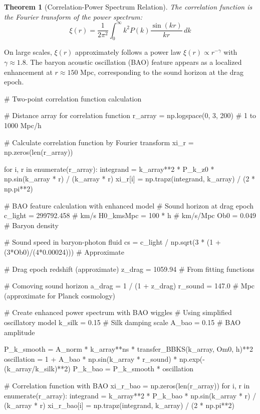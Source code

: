\documentclass[a4paper, 11pt]{article}
\newtheorem{theorem}{Theorem}[section]
\begin{document}
\begin{theorem}[Correlation-Power Spectrum Relation]
The correlation function is the Fourier transform of the power spectrum:
\begin{equation}
\xi(r) = \frac{1}{2\pi^2} \int_0^{\infty} k^2 P(k) \frac{\sin(kr)}{kr} \, dk
\end{equation}
\end{theorem}

On large scales, $\xi(r)$ approximately follows a power law $\xi(r) \propto r^{-\gamma}$ with
$\gamma \approx 1.8$. The baryon acoustic oscillation (BAO) feature appears as a localized
enhancement at $r \approx 150$ Mpc, corresponding to the sound horizon at the drag epoch.

\begin{pycode}
# Two-point correlation function calculation

# Distance array for correlation function
r_array = np.logspace(0, 3, 200)  # 1 to 1000 Mpc/h

# Calculate correlation function by Fourier transform
xi_r = np.zeros(len(r_array))

for i, r in enumerate(r_array):
    integrand = k_array**2 * P_k_z0 * np.sin(k_array * r) / (k_array * r)
    xi_r[i] = np.trapz(integrand, k_array) / (2 * np.pi**2)

# BAO feature calculation with enhanced model
# Sound horizon at drag epoch
c_light = 299792.458  # km/s
H0_kmsMpc = 100 * h   # km/s/Mpc
Ob0 = 0.049           # Baryon density

# Sound speed in baryon-photon fluid
cs = c_light / np.sqrt(3 * (1 + (3*Ob0)/(4*0.00024)))  # Approximate

# Drag epoch redshift (approximate)
z_drag = 1059.94  # From fitting functions

# Comoving sound horizon
a_drag = 1 / (1 + z_drag)
r_sound = 147.0  # Mpc (approximate for Planck cosmology)

# Create enhanced power spectrum with BAO wiggles
# Using simplified oscillatory model
k_silk = 0.15  # Silk damping scale
A_bao = 0.15   # BAO amplitude

P_k_smooth = A_norm * k_array**ns * transfer_BBKS(k_array, Om0, h)**2
oscillation = 1 + A_bao * np.sin(k_array * r_sound) * np.exp(-(k_array/k_silk)**2)
P_k_bao = P_k_smooth * oscillation

# Correlation function with BAO
xi_r_bao = np.zeros(len(r_array))
for i, r in enumerate(r_array):
    integrand = k_array**2 * P_k_bao * np.sin(k_array * r) / (k_array * r)
    xi_r_bao[i] = np.trapz(integrand, k_array) / (2 * np.pi**2)


\end{pycode}
\end{document}
